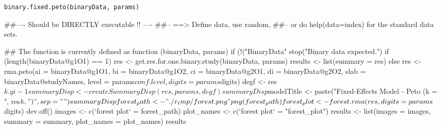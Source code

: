 \begin{Usage}
\begin{verbatim}
binary.fixed.peto(binaryData, params)
\end{verbatim}
\end{Usage}
\begin{Arguments}
\begin{ldescription}
\item[\code{binaryData}] 
\item[\code{params}] 
\end{ldescription}
\end{Arguments}
\begin{Examples}
\begin{ExampleCode}
##---- Should be DIRECTLY executable !! ----
##-- ==>  Define data, use random,
##--    or do  help(data=index)  for the standard data sets.

## The function is currently defined as
function (binaryData, params) 
{
    if (!("BinaryData" %
        stop("Binary data expected.")
    if (length(binaryData@g1O1) == 1) {
        res <- get.res.for.one.binary.study(binaryData, params)
        results <- list(summary = res)
    }
    else {
        res <- rma.peto(ai = binaryData@g1O1, bi = binaryData@g1O2, 
            ci = binaryData@g2O1, di = binaryData@g2O2, slab = binaryData@studyNames, 
            level = params$conf.level, digits = params$digits)
        degf <- res$k.yi - 1
        summaryDisp <- createSummaryDisp(res, params, degf)
        summaryDisp$modelTitle <- paste("Fixed-Effects Model - Peto (k = ", 
            res$k, ")", sep = "")
        summaryDisp
        forest_path <- "./r_tmp/forest.png"
        png(forest_path)
        forest_plot <- forest.rma(res, digits = params$digits)
        dev.off()
        images <- c(`forest plot` = forest_path)
        plot_names <- c(`forest plot` = "forest_plot")
        results <- list(images = images, summary = summary, plot_names = plot_names)
    }
    results
  }
\end{ExampleCode}
\end{Examples}

